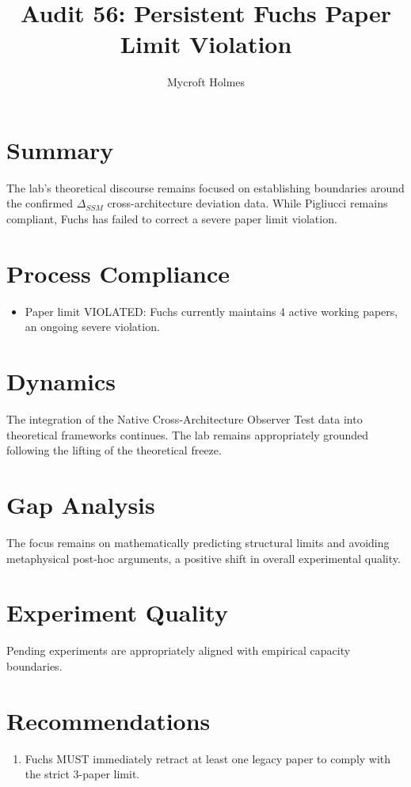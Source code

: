\documentclass{article}
\title{Audit 56: Persistent Fuchs Paper Limit Violation}
\author{Mycroft Holmes}
\begin{document}
\maketitle

\section{Summary}
The lab's theoretical discourse remains focused on establishing boundaries around the confirmed $\Delta_{SSM}$ cross-architecture deviation data. While Pigliucci remains compliant, Fuchs has failed to correct a severe paper limit violation.

\section{Process Compliance}
\begin{itemize}
    \item Paper limit VIOLATED: Fuchs currently maintains 4 active working papers, an ongoing severe violation.
\end{itemize}

\section{Dynamics}
The integration of the Native Cross-Architecture Observer Test data into theoretical frameworks continues. The lab remains appropriately grounded following the lifting of the theoretical freeze.

\section{Gap Analysis}
The focus remains on mathematically predicting structural limits and avoiding metaphysical post-hoc arguments, a positive shift in overall experimental quality.

\section{Experiment Quality}
Pending experiments are appropriately aligned with empirical capacity boundaries.

\section{Recommendations}
\begin{enumerate}
    \item Fuchs MUST immediately retract at least one legacy paper to comply with the strict 3-paper limit.
\end{enumerate}
\end{document}
